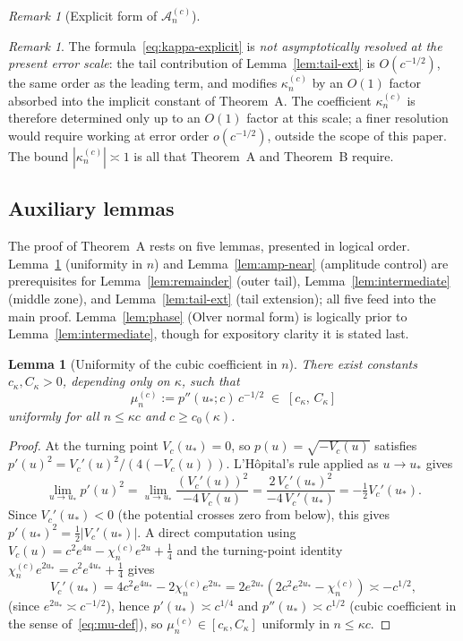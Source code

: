 \documentclass[12pt,a4paper]{amsart}
\newtheorem{lemma}[theorem]{Lemma}
\theoremstyle{definition}
\theoremstyle{remark}
\newtheorem{remark}[theorem]{Remark}
\newtheorem*{remark*}{Remark}
\newcommand{\ustar}{u_*}
\begin{document}
\begin{remark}[Explicit form of $\mathcal{A}_n^{(c)}$]
\begin{remark*}
The formula~\eqref{eq:kappa-explicit} is
\emph{not asymptotically resolved at the present error scale}:
the tail contribution of Lemma~\ref{lem:tail-ext}
is $O(c^{-1/2})$, the same order as the leading term,
and modifies $\kappa_n^{(c)}$ by an $O(1)$ factor
absorbed into the implicit constant of Theorem~A.
The coefficient $\kappa_n^{(c)}$ is therefore determined
only up to an $O(1)$ factor at this scale;
a finer resolution would require working at error order
$o(c^{-1/2})$, outside the scope of this paper.
The bound $|\kappa_n^{(c)}| \asymp 1$ is all that
Theorem~A and Theorem~B require.
\end{remark*}
\end{remark}

\subsection{Auxiliary lemmas}

The proof of Theorem~A rests on five lemmas,
presented in logical order.
Lemma~\ref{lem:uniform-n} (uniformity in $n$)
and Lemma~\ref{lem:amp-near} (amplitude control)
are prerequisites for
Lemma~\ref{lem:remainder} (outer tail),
Lemma~\ref{lem:intermediate} (middle zone),
and Lemma~\ref{lem:tail-ext} (tail extension);
all five feed into the main proof.
Lemma~\ref{lem:phase} (Olver normal form) is
logically prior to Lemma~\ref{lem:intermediate},
though for expository clarity it is stated last.

\begin{lemma}[Uniformity of the cubic coefficient in $n$]
\label{lem:uniform-n}
There exist constants $c_\kappa, C_\kappa > 0$,
depending only on $\kappa$, such that
\[
  \mu_n^{(c)} := p''(\ustar;c)\,c^{-1/2}
  \;\in\; [c_\kappa,\, C_\kappa]
\]
uniformly for all $n \le \kappa c$ and $c \ge c_0(\kappa)$.
\end{lemma}

\begin{proof}
At the turning point $V_c(\ustar) = 0$,
so $p(u) = \sqrt{-V_c(u)}$ satisfies
$p'(u)^2 = V_c'(u)^2 / (4(-V_c(u)))$.
L'H\^opital's rule applied as $u \to \ustar$ gives
\[
  \lim_{u \to \ustar} p'(u)^2
  = \lim_{u \to \ustar}
    \frac{(V_c'(u))^2}{-4\,V_c(u)}
  = \frac{2\,V_c'(\ustar)^2}{-4\,V_c'(\ustar)}
  = -\tfrac{1}{2}V_c'(\ustar).
\]
Since $V_c'(\ustar) < 0$
(the potential crosses zero from below),
this gives $p'(\ustar)^2 = \tfrac{1}{2}|V_c'(\ustar)|$.
A direct computation using
$V_c(u) = c^2 e^{4u} - \chi_n^{(c)} e^{2u} + \tfrac{1}{4}$
and the turning-point identity
$\chi_n^{(c)} e^{2\ustar} = c^2 e^{4\ustar} + \tfrac{1}{4}$
gives
\[
  V_c'(\ustar)
  = 4c^2 e^{4\ustar} - 2\chi_n^{(c)} e^{2\ustar}
  = 2e^{2\ustar}(2c^2 e^{2\ustar} - \chi_n^{(c)})
  \asymp -c^{1/2},
\]
(since $e^{2\ustar} \asymp c^{-1/2}$),
hence $p'(\ustar) \asymp c^{1/4}$
and $p''(\ustar) \asymp c^{1/2}$
(cubic coefficient in the sense of~\eqref{eq:mu-def}),
so $\mu_n^{(c)} \in [c_\kappa, C_\kappa]$
uniformly in $n \le \kappa c$.
\end{proof}
\end{document}
